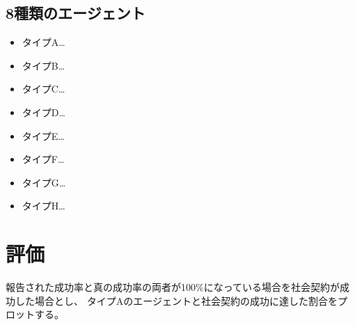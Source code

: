 \subsection{8種類のエージェント}
\begin{itemize}
  \item タイプA…
  \item タイプB…
  \item タイプC…
  \item タイプD…
  \item タイプE…
  \item タイプF…
  \item タイプG…
  \item タイプH…
\end{itemize}

\section{評価}
報告された成功率と真の成功率の両者が100\%になっている場合を社会契約が成功した場合とし、
タイプAのエージェントと社会契約の成功に達した割合をプロットする。

